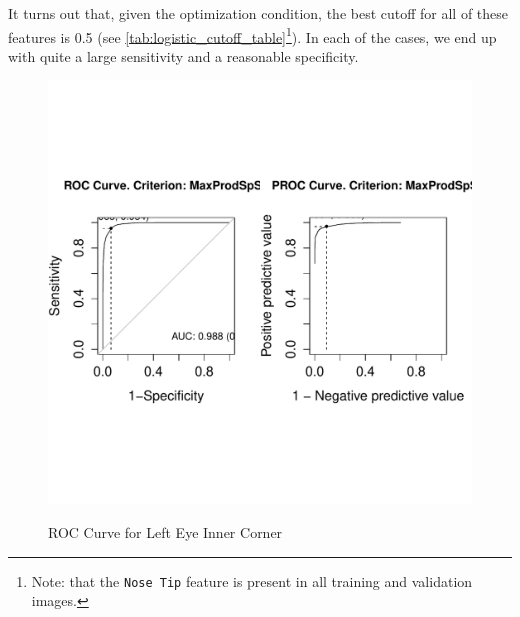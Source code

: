 \documentclass[journal]{IEEEtran}
\begin{document}
It turns out that, given the optimization condition, the best cutoff for all of these features is 0.5 (see \cref{tab:logistic_cutoff_table}\footnote{Note: that the \texttt{Nose Tip} feature is present in all training and validation images.}).  In each of the cases, we end up with quite a large sensitivity and a reasonable specificity.

\begin{figure}[!htb]
  \centering
  \caption{ROC Curve for Left Eye Inner Corner}
  \includegraphics[scale=.49]{roc_left_eye_inner_corner.pdf}
  \label{fig:roc_left_eye_inner_corner}
\end{figure}
\end{document}

